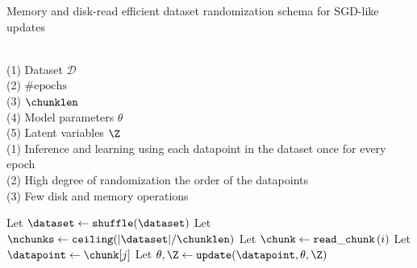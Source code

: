 \begin{algorithm}
\caption{Memory and disk-read efficient dataset randomization schema for SGD-like updates}
\label{code:1}
\begin{algorithmic}[1]

\REQUIRE ~~\\
(1) Dataset $\mathcal{D}$\\
(2) $\mathrm{\#epochs}$\\
(3) $\chunklen$\\
(4) Model parameters $\theta$\\
(5) Latent variables $\Z$
\ENSURE~~\\
(1) Inference and learning using each datapoint in the dataset once for every epoch\\
(2) High degree of randomization the order of the datapoints\\
(3) Few disk and memory operations

\item[]
\STATE Let $\dataset \leftarrow \mathtt{shuffle}(\dataset)$
\STATE Let $\nchunks \leftarrow \mathtt{ceiling}(|\dataset|/\chunklen)$
\STATE Let $\chunk \leftarrow \mathtt{read\_chunk}\left(i\right)$
\STATE Let $\datapoint \leftarrow \chunk[j]$
\STATE Let $\theta,\Z \leftarrow \mathtt{update}(\datapoint,\theta,\Z)$
\ENDFOR
\ENDFOR
\ENDFOR
\end{algorithmic}
\end{algorithm}

